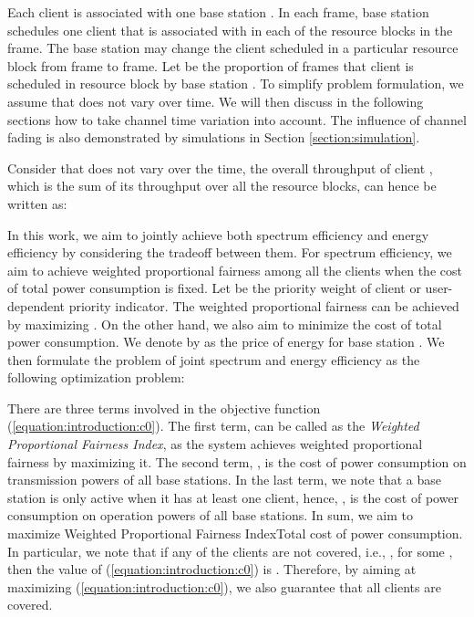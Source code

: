 \documentclass[conference]{IEEEtran}
\begin{document}
Each client  is associated with one base station . In each frame, base station  schedules one client that is associated with  in each of the resource blocks in the frame. The base station may change the client scheduled in a particular resource block from frame to frame. Let  be the proportion of frames that client  is scheduled in resource block  by base station . To simplify problem formulation, we assume that  does not vary over time. We will then discuss in the following sections how to take channel time variation into account. The influence of channel fading is also demonstrated by simulations in Section \ref{section:simulation}.

Consider that  does not vary over the time, the overall throughput of client , which is the sum of its throughput over all the resource blocks, can hence be written as:


In this work, we aim to jointly achieve both spectrum efficiency and energy efficiency by considering the tradeoff between them. For spectrum efficiency, we aim to achieve weighted proportional fairness among all the clients when the cost of total power consumption is fixed. Let  be the priority weight of client  or user-dependent priority indicator. The weighted proportional fairness can be achieved by maximizing . On the other hand, we also aim to minimize the cost of total power consumption. We denote by  as the price of energy for base station . We then formulate the problem of joint spectrum and energy efficiency as the following optimization problem:


There are three terms involved in the objective function (\ref{equation:introduction:c0}). The first term,  can be called as the \emph{Weighted Proportional Fairness Index}, as the system achieves weighted proportional fairness by maximizing it. The second term, , is the cost of power consumption on transmission powers of all base stations. In the last term, we note that a base station is only active when it has at least one client, hence, , is the cost of power consumption on operation powers of all base stations. In sum, we aim to maximize Weighted Proportional Fairness IndexTotal cost of power consumption. In particular, we note that if any of the clients are not covered, i.e., , for some , then the value of (\ref{equation:introduction:c0}) is . Therefore, by aiming at maximizing (\ref{equation:introduction:c0}), we also guarantee that all clients are covered.
\end{document}
